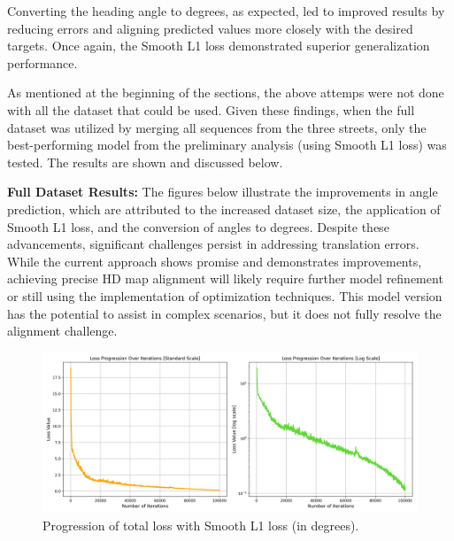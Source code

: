 Converting the heading angle to degrees, as expected, led to improved results by reducing errors and aligning predicted values more closely with the desired targets. Once again, the Smooth L1 loss demonstrated superior generalization performance.

As mentioned at the beginning of the sections, the above attemps were not done with all the dataset that could be used.
Given these findings, when the full dataset was utilized by merging all sequences from the three streets, only the best-performing model from the preliminary analysis (using Smooth L1 loss) was tested. The results are shown and discussed below.

\textbf{Full Dataset Results:} The figures below illustrate the improvements in angle prediction, which are attributed to the increased dataset size, the application of Smooth L1 loss, and the conversion of angles to degrees. Despite these advancements, significant challenges persist in addressing translation errors. While the current approach shows promise and demonstrates improvements, achieving precise HD map alignment will likely require further model refinement or still using the implementation of optimization techniques. This model version has the potential to assist in complex scenarios, but it does not fully resolve the alignment challenge.
\begin{figure}[H]
    \centering
    \includegraphics[width=1\linewidth]{loss_total_l1sDEG_progression_comparison.png}
    \caption{Progression of total loss with Smooth L1 loss (in degrees).}
    \label{fig:total-loss-progression}
\end{figure}

